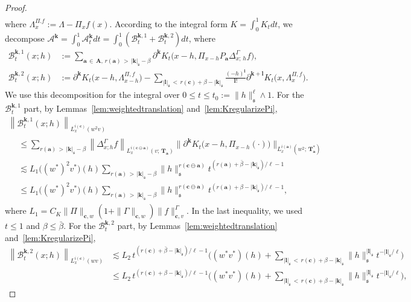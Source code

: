 \documentclass[10pt]{amsart}
\theoremstyle{definition}
\numberwithin{equation}{section}
\newcommand{\mfs}{\mathfrak{s}}
\newcommand{\wco}{w^*}
\newcommand{\vco}{v^*}
\newcommand{\bfa}{\mathbf{a}}
\newcommand{\bfc}{\mathbf{c}}
\newcommand{\bfcoa}{\mathbf{c}\ominus\mathbf{a}}
\newcommand{\bfA}{\mathbf{A}}
\newcommand{\bfT}{\mathbf{T}}
\newcommand{\bfk}{\mathbf{k}}
\newcommand{\bfl}{\mathbf{l}}
\newcommand{\mcA}{\mathcal{A}}
\newcommand{\mcB}{\mathcal{B}}
\begin{document}
\begin{proof}
\begin{align*}
\end{align*}
where $\Lambda_x^{\Pi.f}:=\Lambda-\Pi_xf(x)$. According to the integral form $K=\int_0^1K_tdt$, we decompose $\mcA^{\bfk}=\int_0^1\mcA_t^{\bfk}dt=\int_0^1(\mcB_t^{{\bfk},1}+\mcB_t^{{\bfk},2})dt$, where
\begin{align*}
\mcB_t^{{\bfk},1}(x;h)&:=\sum_{\bfa\,\in\, \bfA,\,r(\bfa)\,>\,|{\bfk}|_{\mfs}-\beta}\partial^{\bfk}K_t\big(x-h,\Pi_{x-h} P_\bfa\Delta_{x;\,h}^\Gamma f\big),\\
\mcB_t^{{\bfk},2}(x;h)&:=\partial^{\bfk}K_t\big(x-h, \Lambda_{x-h}^{\Pi,f}\big) -\sum_{|{\bfl}|_\mfs\,<\,r(\bfc)+\beta-|{\bfk}|_\mfs}\frac{(-h)^{\bfl}}{{\bfl}!}\partial^{{\bfk}+{\bfl}}K_t\big(x,\Lambda_x^{\Pi,f}\big).
\end{align*}
We use this decomposition for the integral over $0\le t\le t_0:=\|h\|_\mfs^\ell\wedge1$. For the $\mcB_t^{{\bfk},1}$ part, by Lemmas~\ref{lem:weightedtranslation} and~\ref{lem:KregularizePi},
\begin{multline*}
\left\|\mcB_t^{{\bfk},1}(x;h)\right\|_{L_x^{i(\bfc)}(w^2v)}\\
\begin{aligned}
 &\le\sum_{r(\bfa)\,>\,|{\bfk}|_{\mfs}-\beta}\left\|\Delta_{x;h}^\Gamma f\right\|_{L_x^{i(\bfcoa)}(v;\,\bfT_\bfa)}
\big\|\partial^{\bfk}K_t\big(x-h,\Pi_{x-h}(\cdot)\big)\big\|_{L_x^{i(\bfa)}\left(w^2;\,\bfT_\bfa^*\right)}\\
&\lesssim L_1\big((\wco)^2\vco\big)(h)
\sum_{r(\bfa)\,>\,|{\bfk}|_{\mfs}-\beta}\|h\|_{\mfs}^{r(\bfcoa)}t^{\left(r(\bfa)+\bar\beta-|{\bfk}|_{\mfs}\right)/\ell-1}\\
&\le L_1\big((\wco)^2\vco\big)(h)
\sum_{r(\bfa)\,>\,|{\bfk}|_{\mfs}-\beta}\|h\|_{\mfs}^{r(\bfcoa)}t^{\left(r(\bfa)+\beta-|{\bfk}|_{\mfs}\right)/\ell-1},
\end{aligned}
\end{multline*}
where $L_1=C_K\|\Pi\|_{\bfc,w}(1+\|\Gamma\|_{\bfc,w})\|f\|_{\bfc,v}^\Gamma$. In the last inequality, we used $t\le1$ and $\beta\le\bar\beta$. For the $\mcB_t^{{\bfk},2}$ part, by Lemmas~\ref{lem:weightedtranslation} and~\ref{lem:KregularizePi},
\begin{align*}
\left\|\mcB_t^{{\bfk},2}(x;h)\right\|_{L_x^{i(\bfc)}(wv)} &\lesssim L_2\,t^{\left(r(\bfc)+\bar\beta-|{\bfk}|_\mfs\right)/\ell-1}
\bigg((\wco\vco)(h)+\sum_{|{\bfl}|_\mfs\,<\,r(\bfc)+\beta-|{\bfk}|_\mfs}\|h\|_\mfs^{|{\bfl}|_\mfs}t^{-|{\bfl}|_\mfs/\ell}\bigg)\\
&\le L_2\,t^{\left(r(\bfc)+\beta-|{\bfk}|_\mfs\right)/\ell-1}
\bigg((\wco\vco)(h)+\sum_{|{\bfl}|_\mfs\,<\,r(\bfc)+\beta-|{\bfk}|_\mfs}\|h\|_\mfs^{|{\bfl}|_\mfs}t^{-|{\bfl}|_\mfs/\ell}\bigg),

\end{align*}
\end{proof}
\end{document}
